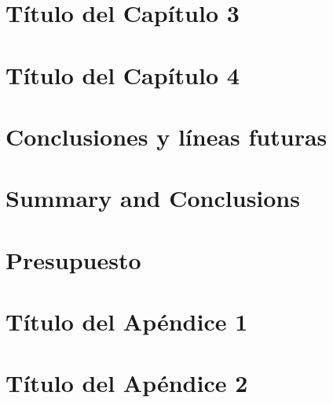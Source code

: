 \documentclass[a4paper,12pt,oneside]{report}
\begin{document}
\chapter{\LARGE Título del Capítulo 3}
\label{chapter:tres}



\newpage{\pagestyle{empty}}
\thispagestyle{empty}

\chapter{\LARGE Título del Capítulo 4}
\label{chapter:cuatro}



\newpage{\pagestyle{empty}}
\thispagestyle{empty}

\chapter{\LARGE Conclusiones y líneas futuras}
\label{chapter:Resultados}



\newpage{\pagestyle{empty}}
\thispagestyle{empty}

\chapter{\LARGE Summary and Conclusions}
\label{chapter:Conclusiones}



\newpage{\pagestyle{empty}}
\thispagestyle{empty}

\chapter{\LARGE Presupuesto}
\label{chapter:presupuesto}



\newpage{\pagestyle{empty}\cleardoublepage}
\thispagestyle{empty}

\begin{appendix}

\chapter{\LARGE Título del Apéndice 1}
\label{appendix:1}


\chapter{\LARGE Título del Apéndice 2}
\label{appendix:2}


\end{appendix}




\end{document}
